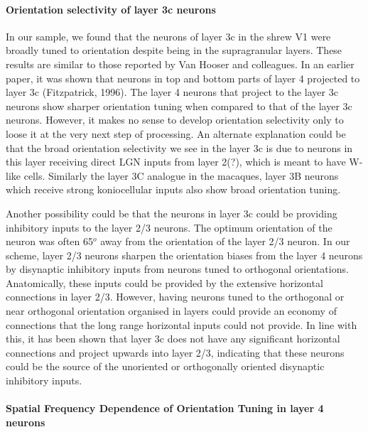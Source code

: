 \paragraph{Orientation selectivity of layer 3c neurons}

In our sample, we found that the neurons of layer 3c in the shrew V1 were broadly tuned to orientation despite being in the supragranular layers. These results are similar to those reported by Van Hooser and colleagues. In an earlier paper, it was shown that neurons in top and bottom parts of layer 4 projected to layer 3c (Fitzpatrick, 1996). The layer 4 neurons that project to the layer 3c neurons show sharper orientation tuning when compared to that of the layer 3c neurons. However, it makes no sense to develop orientation selectivity only to loose it at the very next step of processing. An alternate explanation could be that the broad orientation selectivity we see in the layer 3c is due to neurons in this layer receiving direct LGN inputs from layer 2(?), which is meant to have W-like cells. Similarly the layer 3C analogue in the macaques, layer 3B neurons which receive strong koniocellular inputs also show broad orientation tuning.

Another possibility could be that the neurons in layer 3c could be providing inhibitory inputs to the layer 2/3 neurons. The optimum orientation of the neuron was often 65$^o$ away from the orientation of the layer 2/3 neuron. In our scheme, layer 2/3 neurons sharpen the orientation biases from the layer 4 neurons by disynaptic inhibitory inputs from neurons tuned to orthogonal orientations. Anatomically, these inputs could be provided by the extensive horizontal connections in layer 2/3. However, having neurons tuned to the orthogonal or near orthogonal orientation organised in layers could provide an economy of connections that the long range horizontal inputs could not provide. In line with this, it has been shown that layer 3c does not have any significant horizontal connections and project upwards into layer 2/3, indicating that these neurons could be the source of the unoriented or orthogonally oriented disynaptic inhibitory inputs.

\paragraph {Spatial Frequency Dependence of Orientation Tuning in layer 4 neurons}

